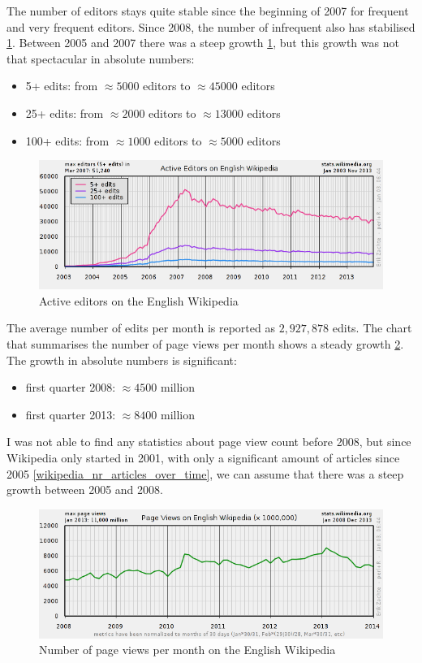 \documentclass[12pt]{report}
\begin{document}
The number of editors stays quite stable since the beginning of 2007
for frequent and very frequent editors. Since 2008, the number of
infrequent also has stabilised \ref{wikipedia_active_editors}. Between 2005 and 2007 there was a
steep growth \ref{wikipedia_active_editors}, but this growth was not
that spectacular in absolute numbers:
\begin{itemize}
\item 5+ edits: from $\approx 5000$ editors to $\approx 45000$ editors
\item 25+ edits: from $\approx 2000$ editors to $\approx 13000$ editors
\item 100+ edits: from $\approx 1000$ editors to $\approx 5000$ editors
\end{itemize}
\begin{figure}[h!]
  \caption{Active editors on the English Wikipedia}
  \label{wikipedia_active_editors}
  \centering
    \includegraphics[scale=0.5]{pics/wikipedia_active_editors.png}
\end{figure}
The average number of edits per month is reported as $2,927,878$
edits.
The chart that summarises the number of page views per month shows 
a steady growth \ref{wikipedia_page_views}. The growth in absolute
numbers is significant:
\begin{itemize}
\item first quarter 2008: $\approx 4500$ million
\item first quarter 2013: $\approx 8400$ million
\end{itemize}
I was not able to find any statistics about page view count before
2008, but since Wikipedia only started in 2001, with only a
significant amount of articles since 2005 \ref{wikipedia_nr_articles_over_time}, we can assume that there
was a steep growth between 2005 and 2008.
\begin{figure}[h!]
  \caption{Number of page views per month on the English Wikipedia}
  \label{wikipedia_page_views}
  \centering
    \includegraphics[scale=0.5]{pics/wikipedia_page_views.png}
\end{figure}
\end{document}

